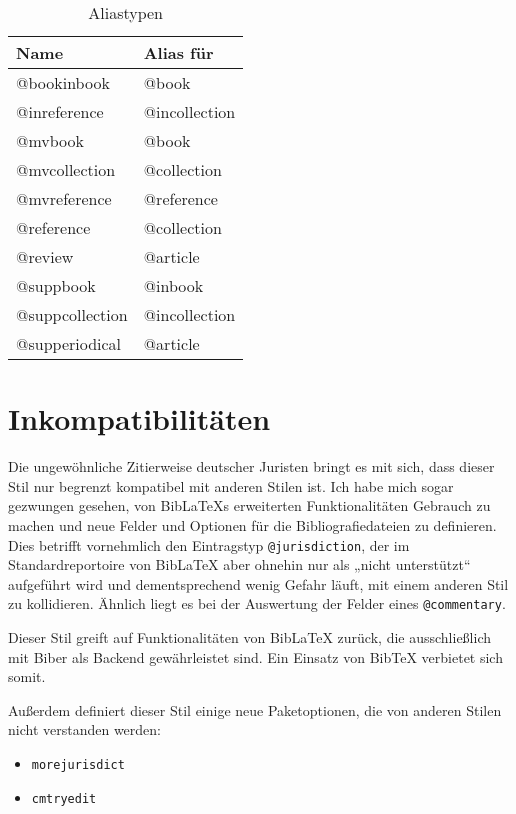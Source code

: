 \documentclass[11pt,a4paper,DIV=calc]{scrartcl}
\newcommand\software[1]{\textsf{#1}}
\newcommand\Biblatex{\software{Bib\LaTeX{}}\xspace}
\begin{document}
\begin{table}
  \centering
  \begin{tabular}{ll}
    \textbf{Name} & \textbf{Alias für}\\
    \hline
    @bookinbook     & @book\\
    @inreference    & @incollection\\
    @mvbook         & @book\\
    @mvcollection   & @collection\\
    @mvreference    & @reference\\
    @reference      & @collection\\
    @review         & @article\\
    @suppbook       & @inbook\\
    @suppcollection & @incollection\\
    @supperiodical  & @article
  \end{tabular}
  \caption{Aliastypen}
  \label{tab:aliastypen}
\end{table}

\section{Inkompatibilitäten}\label{sec:inkompat}

Die ungewöhnliche Zitierweise deutscher Juristen bringt es mit sich,
dass dieser Stil nur begrenzt kompatibel mit anderen Stilen ist. Ich
habe mich sogar gezwungen gesehen, von \Biblatex{}s erweiterten
Funktionalitäten Gebrauch zu machen und neue Felder und Optionen für
die Bibliografiedateien zu definieren. Dies betrifft vornehmlich den
Eintragstyp \verb+@jurisdiction+, der im Standardreportoire von
\Biblatex aber ohnehin nur als „nicht unterstützt“ aufgeführt wird und
dementsprechend wenig Gefahr läuft, mit einem anderen Stil zu
kollidieren. Ähnlich liegt es bei der Auswertung der Felder eines
\verb+@commentary+.

Dieser Stil greift auf Funktionalitäten von \Biblatex zurück, die
ausschließlich mit \software{Biber} als Backend gewährleistet
sind. Ein Einsatz von \software{Bib\TeX{}} verbietet sich somit.

Außerdem definiert dieser Stil einige neue Paketoptionen, die von
anderen Stilen nicht verstanden werden:

\begin{itemize}
\item \verb+morejurisdict+
\item \verb+cmtryedit+
\end{itemize}
\end{document}
